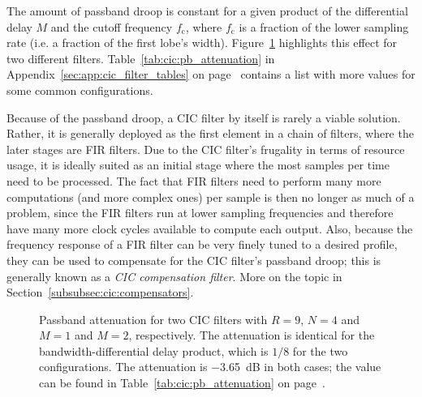 The   amount   of  passband   droop   is   constant   for  a   given   product
of    the    differential    delay    $M$    and    the    cutoff    frequency
$f_\mathrm{c}$,    where    $f_\mathrm{c}$    is    a    fraction    of    the
lower   sampling    rate   (i.e.    a   fraction    of   the    first   lobe's
width). Figure~\ref{fig:cic:freq_responses:passband:attenuation}    highlights
this  effect  for  two  different  filters. Table~\ref{tab:cic:pb_attenuation}
in                 Appendix~\ref{sec:app:cic_filter_tables}                 on
page~\pageref{tab:cic:pb_attenuation}  contains a  list with  more values  for
some common configurations.

Because of  the passband  droop, a  CIC filter  by itself  is rarely  a viable
solution. Rather, it is generally deployed as  the first element in a chain of
filters,  where the  later stages  are FIR  filters. Due to  the CIC  filter's
frugality in terms of resource usage, it is ideally suited as an initial stage
where  the most  samples per  time  need to  be processed. The  fact that  FIR
filters need  to perform many  more computations  (and more complex  ones) per
sample is  then no  longer as  much of a  problem, since  the FIR  filters run
at  lower sampling  frequencies  and  therefore have  many  more clock  cycles
available  to  compute  each  output. Also,  because  the  frequency  response
of  a  FIR  filter can  be  very  finely  tuned  to a  desired  profile,  they
can  be used  to  compensate for  the  CIC filter's  passband  droop; this  is
generally  known as  a \emph{CIC  compensation filter}. More  on the  topic in
Section~\ref{subsubsec:cic:compensators}.

\begin{figure}
    \centering
        
        \caption[CIC Filter: Passband and Aliasing Attenuation]{%
            Passband   attenuation   for   two   CIC   filters   with   $R=9$,
            $N=4$   and  $M=1$   and   $M=2$,  respectively. The   attenuation
            is  identical   for  the  bandwidth-differential   delay  product,
            which    is   $1/8$    for    the    two   configurations.     The
            attenuation   is  \SI{-3.65}{\dB}   in  both   cases;  the   value
            can    be   found    in   Table~\ref{tab:cic:pb_attenuation}    on
            page~\pageref{tab:cic:pb_attenuation}.%
        }
        \label{fig:cic:freq_responses:passband:attenuation}
\end{figure}

